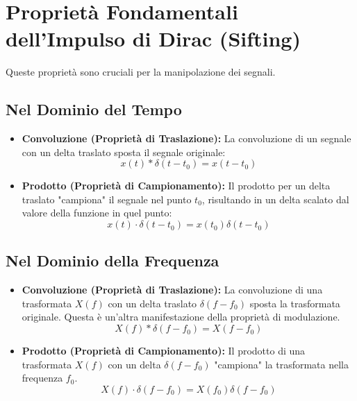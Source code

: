 \section{Proprietà Fondamentali dell'Impulso di Dirac (Sifting)}
Queste proprietà sono cruciali per la manipolazione dei segnali.

\subsection*{Nel Dominio del Tempo}
\begin{itemize}
    \item \textbf{Convoluzione (Proprietà di Traslazione):} La convoluzione di un segnale con un delta traslato sposta il segnale originale:
    \begin{equation*}
        x(t) * \delta(t-t_0) = x(t-t_0)
    \end{equation*}
    
    \item \textbf{Prodotto (Proprietà di Campionamento):} Il prodotto per un delta traslato "campiona" il segnale nel punto $t_0$, risultando in un delta scalato dal valore della funzione in quel punto:
    \begin{equation*}
        x(t) \cdot \delta(t-t_0) = x(t_0) \delta(t-t_0)
    \end{equation*}
\end{itemize}

\subsection*{Nel Dominio della Frequenza}
\begin{itemize}
    \item \textbf{Convoluzione (Proprietà di Traslazione):} La convoluzione di una trasformata $X(f)$ con un delta traslato $\delta(f-f_0)$ sposta la trasformata originale. Questa è un'altra manifestazione della proprietà di modulazione.
    \begin{equation*}
        X(f) * \delta(f-f_0) = X(f-f_0)
    \end{equation*}
    
    \item \textbf{Prodotto (Proprietà di Campionamento):} Il prodotto di una trasformata $X(f)$ con un delta $\delta(f-f_0)$ "campiona" la trasformata nella frequenza $f_0$.
    \begin{equation*}
       X(f) \cdot \delta(f-f_0) = X(f_0) \delta(f-f_0)
    \end{equation*}
\end{itemize}


